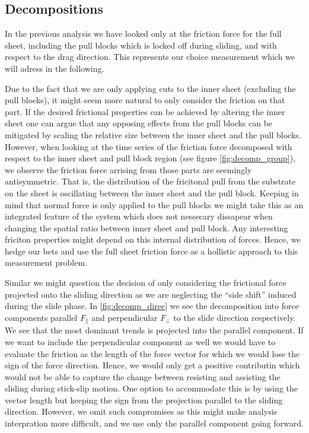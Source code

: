 \subsection{Decompositions}
In the previous analysis we have looked only at the friction force for the full
sheet, including the pull blocks which is locked off during sliding, and with
respect to the drag direction. This represents our choice measurement which we will adress in the following.

Due to the fact that we are only applying cuts to the inner sheet (excluding the
pull blocks), it might seem more natural to only consider the friction on that
part. If the desired frictional properties can be achieved by altering the inner
sheet one can argue that any opposing effects from the pull blocks can be
mitigated by scaling the relative size between the inner sheet and the pull
blocks. However, when looking at the time series of the friction force
decomposed with respect to the inner sheet and pull block region (see figure
\cref{fig:decomp_group}), we observe the friction force arrising from those parts
are seemingly antisymmetric. That is, the distribution of the fricitonal pull from the substrate on the sheet is
oscillating between the inner sheet and the pull block. Keeping in mind that 
normal force is only applied to the pull blocks we might take this as an
integrated feature of the system which does not nessecary dissapear when changing the spatial ratio between inner sheet and pull block. Any interesting friciton properties might depend on this internal distribution of forces. Hence, we hedge our bets
and use the full sheet friction force as a hollistic approach to this measurement
problem.

Similar we might question the decision of
only considering the frictional force projected onto the sliding direction as
we are neglecting the ``side shift'' induced during the slide phase. In \cref{fig:decomp_direc} we see the decomposition into force components parallel $F_{\parallel}$ and perpendicular $F_{\perp}$ to the slide direction respectively. We see that the most dominant trends is projected into the parallel component. If we want to include the perpendicular component as well we would have to evaluate the friction as the length of the force vector for which we would lose the sign of the force direction. Hence, we would only get a positive contributin which would not be able to capture the change between resisting and assisting the sliding during stick-slip motion. One option to accommodate this is by using the vector length but keeping the sign from the projection parallel to the sliding direction. However, we omit such compromises as this might make analysis interpration more difficult, and we use only the parallel component going forward. 

